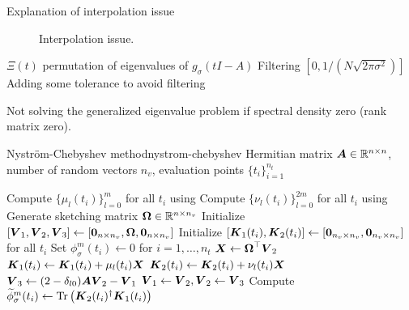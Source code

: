 Explanation of interpolation issue \cite{lin2017randomized}
\begin{figure}[ht]
    \centering
    
    \caption{Interpolation issue.}
    \label{fig:3-nystrom-interpolation-issue}
\end{figure}

$\Xi(t)$ permutation of eigenvalues of $g_{\sigma}(tI - A)$
Filtering $[0, 1 / (N \sqrt{2 \pi \sigma^2})]$ \cite{lin2017randomized}
Adding some tolerance to avoid filtering

Not solving the generalized eigenvalue problem if spectral density zero (rank matrix zero).

\begin{algo}{Nystr\"om-Chebyshev method}{nystrom-chebyshev}
    Hermitian matrix $\boldsymbol{A} \in \mathbb{R}^{n \times n}$, number of random vectors $n_v$,
    evaluation points $\{t_i\}_{i=1}^{n_t}$
    \begin{algorithmic}[1]
        \State Compute $\{\mu_l(t_i)\}_{l=0}^m$ for all $t_i$ using 
        \State Compute $\{\nu_l(t_i)\}_{l=0}^{2m}$ for all $t_i$ using 
        \State Generate sketching matrix $\boldsymbol{\Omega} \in \mathbb{R}^{n \times n_v}$ %
        \State Initialize $[\boldsymbol{V}_1, \boldsymbol{V}_2, \boldsymbol{V}_3] \gets [\boldsymbol{0}_{n \times n_v}, \boldsymbol{\Omega}, \boldsymbol{0}_{n \times n_v}]$
        \State Initialize $[\boldsymbol{K}_1(t_i), \boldsymbol{K}_2(t_i)] \gets [\boldsymbol{0}_{n_v \times n_v}, \boldsymbol{0}_{n_v \times n_v}]$ for all $t_i$
        \State Set ${\phi}_{\sigma}^m(t_i) \gets 0$ for $i=1,\dots,n_t$
          \State $\boldsymbol{X} \gets \boldsymbol{\Omega}^{\top} \boldsymbol{V}_2$
                \State $\boldsymbol{K}_1(t_i) \gets \boldsymbol{K}_1(t_i) + \mu_l(t_i) \boldsymbol{X}$
            \EndIf
            \State $\boldsymbol{K}_2(t_i) \gets \boldsymbol{K}_2(t_i) + \nu_l(t_i) \boldsymbol{X}$
          \EndFor
          \State $\boldsymbol{V}_3 \gets (2 - \delta_{l0}) \boldsymbol{A} \boldsymbol{V}_2 - \boldsymbol{V}_1$ 
          \State $\boldsymbol{V}_1 \gets \boldsymbol{V}_2, \boldsymbol{V}_2 \gets \boldsymbol{V}_3$
        \EndFor
          \State Compute $\widetilde{\phi}_{\sigma}^m(t_i) \gets \operatorname{Tr}\left( \boldsymbol{K}_2(t_i)^{\dagger}\boldsymbol{K}_1(t_i) \right)$
        \EndFor
    \end{algorithmic}
\end{algo}

